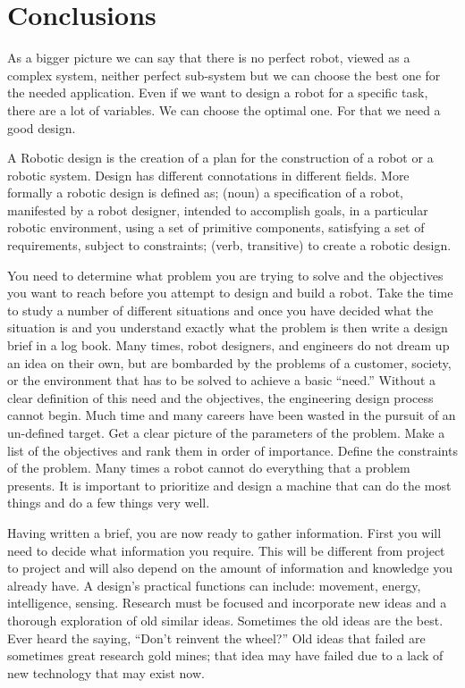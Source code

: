 \documentclass{romjist}
\begin{document}
\section{Conclusions}
As a bigger picture we can say that there is no perfect robot, viewed as a complex system, neither   perfect sub-system but we can choose the best one for the needed application. Even if we want to design a robot for a specific task, there are a lot of variables. We can choose the optimal one. For that we need a good design.\par
A Robotic design is the creation of a plan for the construction of a robot or a robotic system. Design has different connotations in different fields. More formally a robotic design is defined as; (noun) a specification of a robot, manifested by a robot designer, intended to accomplish goals, in a particular robotic environment, using a set of primitive components, satisfying a set of requirements, subject to constraints; (verb, transitive) to create a robotic design.\par
You need to determine what problem you are trying to solve and the objectives you want to reach before you attempt to design and build a robot. Take the time to study a number of different situations and once you have decided what the situation is and you understand exactly what the problem is then write a design brief in a log book. Many times, robot designers, and engineers do not dream up an idea on their own, but are bombarded by the problems of a customer, society, or the environment that has to be solved to achieve a basic “need.” Without a clear definition of this need and the objectives, the engineering design process cannot begin. Much time and many careers have been wasted in the pursuit of an un-defined target. Get a clear picture of the parameters of the problem. Make a list of the objectives and rank them in order of importance. Define the constraints of the problem. Many times a robot cannot do everything that a problem presents. It is important to prioritize and design a machine that can do the most things and do a few things very well.\par
Having written a brief, you are now ready to gather information. First you will need to decide what information you require. This will be different from project to project and will also depend on the amount of information and knowledge you already have. A design’s practical functions can include: movement, energy, intelligence, sensing. Research must be focused and incorporate new ideas and a thorough exploration of old similar ideas. Sometimes the old ideas are the best. Ever heard the saying, “Don’t reinvent the wheel?” Old ideas that failed are sometimes great research gold mines; that idea may have failed due to a lack of new technology that may exist now.\par
\end{document}
